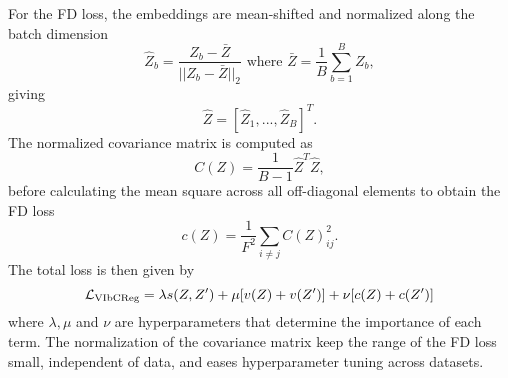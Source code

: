 \documentclass[../../thesis.tex]{subfiles}
\begin{document}
For the FD loss, the embeddings are mean-shifted and normalized along the batch dimension
\begin{equation}
    \widehat{Z}_b = \frac{Z_b-\bar{Z}}{||Z_b-\bar{Z}||_2} \text{ where }  \bar{Z} = \frac{1}{B}\sum_{b=1}^B  Z_b,
\end{equation}
giving 
\begin{equation}
    \widehat{Z} = [\widehat{Z}_1,...,\widehat{Z}_B]^T.
\end{equation}
The normalized covariance matrix is computed as
\begin{equation}
    C(Z) = \frac{1}{B-1}\widehat{Z}^T \widehat{Z},
\end{equation}
before calculating the mean square across all off-diagonal elements to obtain the FD loss
\begin{equation}
    c(Z) = \frac{1}{F^2}\sum_{i\neq j} C(Z)_{ij}^2.
\end{equation}
The total loss is then given by
\begin{equation}
    \label{eq:VIbCRegLoss}
    \mathcal{L}_\text{VIbCReg} = \lambda s(Z,Z') + \mu [v(Z) + v(Z')] + \nu[c(Z)+c(Z')]
\end{equation}
where $\lambda, \mu$ and $\nu$ are hyperparameters that determine the importance of each term. The normalization of the covariance matrix keep the range of the FD loss small, independent of data, and eases hyperparameter tuning across datasets.

\end{document}
